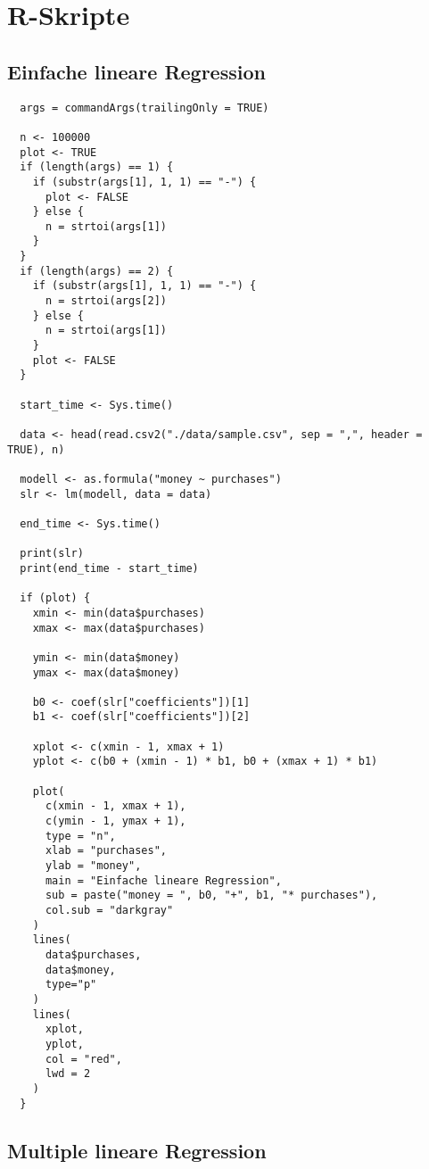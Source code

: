 \chapter{R-Skripte}
\label{appendix:B}

\section{Einfache lineare Regression}
\label{appendix:B:1}

\begin{verbatim}
  args = commandArgs(trailingOnly = TRUE)

  n <- 100000
  plot <- TRUE
  if (length(args) == 1) {
    if (substr(args[1], 1, 1) == "-") {
      plot <- FALSE
    } else {
      n = strtoi(args[1])
    }
  }
  if (length(args) == 2) {
    if (substr(args[1], 1, 1) == "-") {
      n = strtoi(args[2])
    } else {
      n = strtoi(args[1])
    }
    plot <- FALSE
  }

  start_time <- Sys.time()

  data <- head(read.csv2("./data/sample.csv", sep = ",", header = TRUE), n)

  modell <- as.formula("money ~ purchases")
  slr <- lm(modell, data = data)

  end_time <- Sys.time()

  print(slr)
  print(end_time - start_time)

  if (plot) {
    xmin <- min(data$purchases)
    xmax <- max(data$purchases)

    ymin <- min(data$money)
    ymax <- max(data$money)

    b0 <- coef(slr["coefficients"])[1]
    b1 <- coef(slr["coefficients"])[2]

    xplot <- c(xmin - 1, xmax + 1)
    yplot <- c(b0 + (xmin - 1) * b1, b0 + (xmax + 1) * b1)

    plot(
      c(xmin - 1, xmax + 1),
      c(ymin - 1, ymax + 1),
      type = "n",
      xlab = "purchases",
      ylab = "money",
      main = "Einfache lineare Regression",
      sub = paste("money = ", b0, "+", b1, "* purchases"),
      col.sub = "darkgray"
    )
    lines(
      data$purchases,
      data$money,
      type="p"
    )
    lines(
      xplot,
      yplot,
      col = "red",
      lwd = 2
    )
  }
\end{verbatim}

\section{Multiple lineare Regression}
\label{appendix:B:2}

